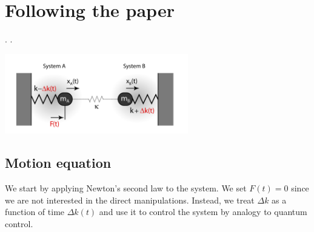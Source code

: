 \newcommand{\dk}[0]{\Delta k(t)}
\newcommand{\K}[0]{\kappa}
\newcommand{\Oc}[0]{\Omega_c}
\newcommand{\Oz}[0]{\Omega_0}
\newcommand{\Od}[0]{\Omega_d(t)}
\newcommand{\xp}[0]{x_+}
\newcommand{\xm}[0]{x_-}
\newcommand{\Op}[0]{\Omega_{+}}
\newcommand{\Om}[0]{\Omega_{-}}
\newcommand{\Opm}[0]{\Omega_{\pm}}
\newcommand{\Omp}[0]{\Omega_{\mp}}
\newcommand{\dO}[0]{\Delta\Omega}
\newcommand{\od}[0]{\omega_d(t)}
\renewcommand{\a}[0]{a(t)}
\renewcommand{\b}[0]{b(t)}
\newcommand{\odr}[0]{\omega_{drive}}
\newcommand{\ar}[0]{\overline{a}(t)}
\newcommand{\br}[0]{\overline{b}(t)}


\newpage

\section{Following the paper}

\ls {}.
\li {}.
\le

\begin{center}
  \includegraphics[width=0.6\textwidth]{img/osc.png}
\end{center}

\subsection{Motion equation}

We start by applying Newton's second law to the system. We set \(F(t) = 0\) since we are not
interested in the direct manipulations. Instead, we treat \(\Delta k\) as a function of time $\dk$
and use it to control the system by analogy to quantum control.

